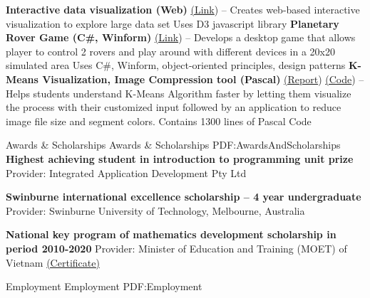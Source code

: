 \documentclass[letterpaper,MMMyyyy,nonstopmode]{simpleresumecv}
\begin{document}
\begin{Body}
\BulletItem
\textbf{Interactive data visualization (Web)} \href{https://dunglai.github.io/SwinWork/cars-visual/index.html}{(\color{blue}Link})
\hfill
{} --
\SubBulletItem Creates web-based interactive visualization to explore large data set \SubBulletItem Uses D3 javascript library
\Gap\Gap\Gap
\BulletItem
\textbf{Planetary Rover Game (C\#, Winform)} \href{https://dunglai.github.io/2017/05/27/Planetary-Rover/}{(\color{blue}Link})
\hfill
{} --
\SubBulletItem Develops a desktop game that allows player to control 2 rovers and play around with different devices in a 20x20 simulated area
\SubBulletItem Uses C\#, Winform, object-oriented principles, design patterns
\Gap\Gap\Gap
\BulletItem
\textbf{K-Means Visualization, Image Compression tool (Pascal)} \href{https://dunglai.github.io/public/post-assets/Kmeans/Report.pdf}{(\color{blue}Report}) \href{https://github.com/DungLai/Image-Compression-Segmentation}{(\color{blue}Code})
\hfill
{} --
\SubBulletItem Helps students understand K-Means Algorithm faster by letting them visualize the process with their customized input followed by an application to reduce image file size and segment colors.
\SubBulletItem Contains 1300 lines of Pascal Code



\Section
{Awards \&\newline
Scholarships}
{Awards \& Scholarships}
{PDF:AwardsAndScholarships}
\BulletItem
\textbf{Highest achieving student in introduction to programming unit prize}
\hfill
{}
\SubBulletItem Provider: Integrated Application Development Pty Ltd

\Gap\Gap\Gap

\BulletItem
\textbf{Swinburne international excellence scholarship – 4 year undergraduate}
\hfill
{}
\SubBulletItem Provider: Swinburne University of Technology, Melbourne, Australia

\Gap\Gap\Gap
\BulletItem
\textbf{National key program of mathematics development scholarship in period 2010-2020}
\hfill
{}
\SubBulletItem Provider: Minister of Education and Training (MOET) of Vietnam \href{https://dunglai.github.io/public/post-assets/About/CVLatex/MathCert.png}{(\color{blue}Certificate)}

\Section 
{Employment}
{Employment}
{PDF:Employment}


\end{Body}
\end{document}
